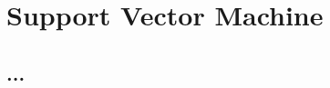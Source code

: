 \section{Support Vector Machine}
\label{sec:exp-svm}

    \subsection{...}
    \label{subsec:exp-svm-param}

   